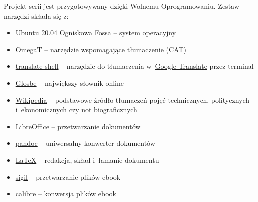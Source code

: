 \documentclass[oneside,polish,11pt,sfheadings]{mwbk}
\begin{document}
Projekt serii jest przygotowywany dzięki Wolnemu Oprogramowaniu. Zestaw narzędzi składa się z:
\begin{itemize}
\item \href{https://ubuntu.com/}{Ubuntu 20.04 Ogniskowa Fossa} -- system operacyjny
\item \href{https://omegat.org/}{OmegaT} -- narzędzie wspomagające tłumaczenie (CAT)
\item \href{https://github.com/soimort/translate-shell}{translate-shell} -- narzędzie do tłumaczenia w~\href{https://translate.google.pl}{Google Translate} przez terminal 
\item \href{https://glosbe.com/en/pl}{Glosbe} -- największy słownik online
\item \href{https://www.wikipedia.org/}{Wikipedia} -- podstawowe źródło tłumaczeń pojęć technicznych, politycznych i~ekonomicznych czy not biograficznych
\item \href{https://www.libreoffice.org/}{LibreOffice} -- przetwarzanie dokumentów 
\item \href{http://pandoc.org}{pandoc} -- uniwersalny konwerter dokumentów 
\item \href{https://www.latex-project.org/}{LaTeX} -- redakcja, skład i~łamanie dokumentu
\item \href{https://sigil-ebook.com/}{sigil} -- przetwarzanie plików ebook
\item \href{https://calibre-ebook.com/}{calibre} -- konwersja plików ebook
\end{itemize}



\newpage
\printendnotes

\tableofcontents{}
\end{document}
